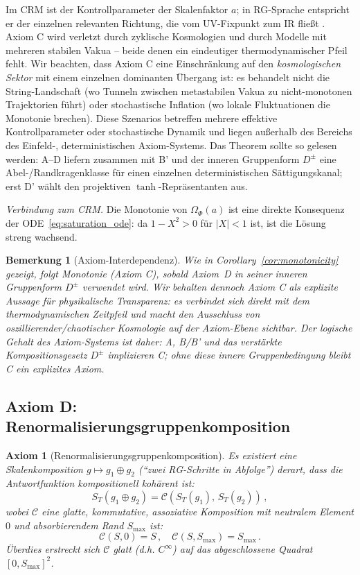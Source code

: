 \documentclass[aps,prd,twocolumn,superscriptaddress,nofootinbib]{revtex4-2}
\newtheorem{remark}{Bemerkung}
\newtheorem{axiom}{Axiom}
\begin{document}
Im CRM ist der Kontrollparameter der Skalenfaktor $a$; in RG-Sprache entspricht er der einzelnen relevanten Richtung, die vom UV-Fixpunkt zum IR fließt \cite{Percacci2017}. Axiom C wird verletzt durch zyklische Kosmologien und durch Modelle mit mehreren stabilen Vakua -- beide denen ein eindeutiger thermodynamischer Pfeil fehlt. Wir beachten, dass Axiom C eine Einschränkung auf den \textit{kosmologischen Sektor} mit einem einzelnen dominanten Übergang ist: es behandelt nicht die String-Landschaft (wo Tunneln zwischen metastabilen Vakua zu nicht-monotonen Trajektorien führt) oder stochastische Inflation (wo lokale Fluktuationen die Monotonie brechen). Diese Szenarios betreffen mehrere effektive Kontrollparameter oder stochastische Dynamik und liegen außerhalb des Bereichs des Einfeld-, deterministischen Axiom-Systems. Das Theorem sollte so gelesen werden: A--D liefern zusammen mit B' und der inneren Gruppenform $D^\pm$ eine Abel-/Randkragenklasse für einen einzelnen deterministischen Sättigungskanal; erst D' wählt den projektiven $\tanh$-Repräsentanten aus.

\textit{Verbindung zum CRM.} Die Monotonie von $\Omega_\Phi(a)$ ist eine direkte Konsequenz der ODE~\eqref{eq:saturation_ode}: da $1 - X^2 > 0$ für $|X| < 1$ ist, ist die Lösung streng wachsend.

\begin{remark}[Axiom-Interdependenz]
Wie in Corollary~\ref{cor:monotonicity} gezeigt, folgt Monotonie (Axiom C), sobald Axiom~D in seiner inneren Gruppenform $D^\pm$ verwendet wird. Wir behalten dennoch Axiom C als explizite Aussage für physikalische Transparenz: es verbindet sich direkt mit dem thermodynamischen Zeitpfeil und macht den Ausschluss von oszillierender/chaotischer Kosmologie auf der Axiom-Ebene sichtbar. Der logische Gehalt des Axiom-Systems ist daher: A, B/B' und das verstärkte Kompositionsgesetz $D^\pm$ implizieren C; ohne diese innere Gruppenbedingung bleibt C ein explizites Axiom.
\end{remark}

\subsection{Axiom D: Renormalisierungsgruppenkomposition}

\begin{axiom}[Renormalisierungsgruppenkomposition]
\label{ax:composition}
Es existiert eine Skalenkomposition $g \mapsto g_1 \oplus g_2$ (``zwei RG-Schritte in Abfolge'') derart, dass die Antwortfunktion kompositionell kohärent ist:
\begin{equation}
S_T(g_1 \oplus g_2) = \mathcal{C}\!\left(S_T(g_1),\, S_T(g_2)\right)\,,
\label{eq:composition}
\end{equation}
wobei $\mathcal{C}$ eine glatte, kommutative, assoziative Komposition mit neutralem Element $0$ und absorbierendem Rand $S_{\max}$ ist:
\begin{equation}
\mathcal{C}(S, 0) = S\,, \quad \mathcal{C}(S, S_{\max}) = S_{\max}\,.
\label{eq:composition_boundary}
\end{equation}
Überdies erstreckt sich $\mathcal{C}$ glatt (d.h. $C^\infty$) auf das abgeschlossene Quadrat $[0, S_{\max}]^2$.
\end{axiom}
\end{document}

